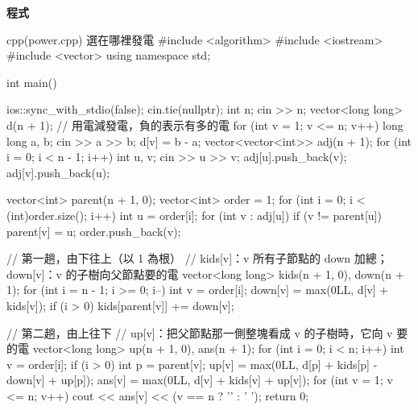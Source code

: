 \textbf{程式}

\begin{example}[label=ex:tdp-power]{cpp}{(power.cpp) 選在哪裡發電}
#include <algorithm>
#include <iostream>
#include <vector>
using namespace std;

int main() {
    ios::sync_with_stdio(false);
    cin.tie(nullptr);
    int n;
    cin >> n;
    vector<long long> d(n + 1);             // 用電減發電，負的表示有多的電
    for (int v = 1; v <= n; v++) {
        long long a, b;
        cin >> a >> b;
        d[v] = b - a;
    }
    vector<vector<int>> adj(n + 1);
    for (int i = 0; i < n - 1; i++) {
        int u, v;
        cin >> u >> v;
        adj[u].push_back(v);
        adj[v].push_back(u);
    }

    vector<int> parent(n + 1, 0);
    vector<int> order = {1};
    for (int i = 0; i < (int)order.size(); i++) {
        int u = order[i];
        for (int v : adj[u]) {
            if (v != parent[u]) {
                parent[v] = u;
                order.push_back(v);
            }
        }
    }

    // 第一趟，由下往上（以 1 為根）
    // kids[v]：v 所有子節點的 down 加總；down[v]：v 的子樹向父節點要的電
    vector<long long> kids(n + 1, 0), down(n + 1);
    for (int i = n - 1; i >= 0; i--) {
        int v = order[i];
        down[v] = max(0LL, d[v] + kids[v]);
        if (i > 0) {
            kids[parent[v]] += down[v];
        }
    }

    // 第二趟，由上往下
    // up[v]：把父節點那一側整塊看成 v 的子樹時，它向 v 要的電
    vector<long long> up(n + 1, 0), ans(n + 1);
    for (int i = 0; i < n; i++) {
        int v = order[i];
        if (i > 0) {
            int p = parent[v];
            up[v] = max(0LL, d[p] + kids[p] - down[v] + up[p]);
        }
        ans[v] = max(0LL, d[v] + kids[v] + up[v]);
    }
    for (int v = 1; v <= n; v++) {
        cout << ans[v] << (v == n ? '\n' : ' ');
    }
    return 0;
}
\end{example}


